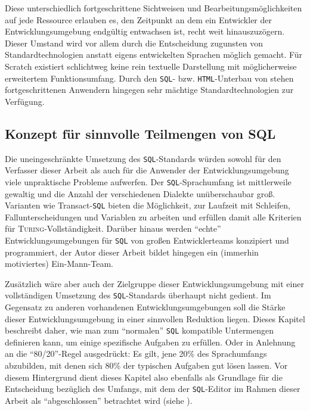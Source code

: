 Diese unterschiedlich fortgeschrittene Sichtweisen und Bearbeitungsmöglichkeiten auf jede Ressource erlauben es, den Zeitpunkt an dem ein Entwickler der Entwicklungsumgebung endgültig entwachsen ist, recht weit hinauszuzögern. Dieser Umstand wird vor allem durch die Entscheidung zugunsten von Standardtechnologien anstatt eigens entwickelten Sprachen möglich gemacht. Für Scratch existiert schlichtweg keine rein textuelle Darstellung mit möglicherweise erweitertem Funktionsumfang. Durch den \texttt{SQL}- bzw. \texttt{HTML}-Unterbau von \idename{} stehen fortgeschrittenen Anwendern hingegen sehr mächtige Standardtechnologien zur Verfügung.

\subsection{Konzept für sinnvolle Teilmengen von SQL}
\label{sec:sql-subset}


Die uneingeschränkte Umsetzung des \texttt{SQL}-Standards würden sowohl für den Verfasser dieser Arbeit als auch für die Anwender der Entwicklungsumgebung viele unpraktische Probleme aufwerfen. Der \texttt{SQL}-Sprachumfang ist mittlerweile gewaltig und die Anzahl der verschiedenen Dialekte unüberschaubar groß. Varianten wie Transact-\texttt{SQL} bieten die Möglichkeit, zur Laufzeit mit Schleifen, Fallunterscheidungen und Variablen zu arbeiten und erfüllen damit alle Kriterien für \textsc{Turing}-Vollständigkeit. Darüber hinaus werden ``echte'' Entwicklungsumgebungen für \texttt{SQL} von großen Entwicklerteams konzipiert und programmiert, der Autor dieser Arbeit bildet hingegen ein (immerhin motiviertes) Ein-Mann-Team.

Zusätzlich wäre aber auch der Zielgruppe dieser Entwicklungsumgebung mit einer vollständigen Umsetzung des \texttt{SQL}-Standards überhaupt nicht gedient. Im Gegensatz zu anderen vorhandenen Entwicklungsumgebungen soll die Stärke dieser Entwicklungsumgebung in einer sinnvollen Reduktion liegen. Dieses Kapitel beschreibt daher, wie man zum "`normalen"' \texttt{SQL} kompatible Untermengen definieren kann, um einige spezifische Aufgaben zu erfüllen. Oder in Anlehnung an die "`80/20"'-Regel ausgedrückt: Es gilt, jene 20\% des Sprachumfangs abzubilden, mit denen sich 80\% der typischen Aufgaben gut lösen lassen. Vor diesem Hintergrund dient dieses Kapitel also ebenfalls als Grundlage für die Entscheidung bezüglich des Umfangs, mit dem der \texttt{SQL}-Editor im Rahmen dieser Arbeit als "`abgeschlossen"' betrachtet wird (siehe ).

